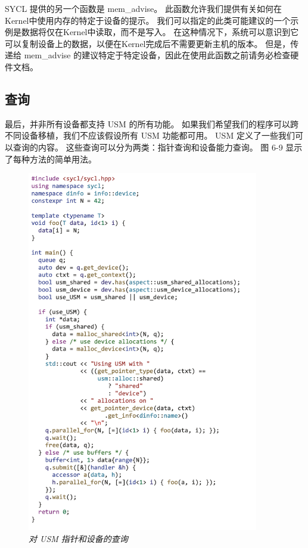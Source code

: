 SYCL 提供的另一个函数是 mem\_advise。 此函数允许我们提供有关如何在Kernel中使用内存的特定于设备的提示。 
我们可以指定的此类可能建议的一个示例是数据将仅在Kernel中读取，而不是写入。 
在这种情况下，系统可以意识到它可以复制设备上的数据，以便在Kernel完成后不需要更新主机的版本。 
但是，传递给 mem\_advise 的建议特定于特定设备，因此在使用此函数之前请务必检查硬件文档。

\subsection{查询}
最后，并非所有设备都支持 USM 的所有功能。 
如果我们希望我们的程序可以跨不同设备移植，我们不应该假设所有 USM 功能都可用。 
USM 定义了一些我们可以查询的内容。 这些查询可以分为两类：指针查询和设备能力查询。 
图 6-9 显示了每种方法的简单用法。

\begin{figure}[H]
	\centering
	\includegraphics[width=0.9\textwidth]{figs/F6.9.png}
	\caption{\textit{对 USM 指针和设备的查询}}
\end{figure}

